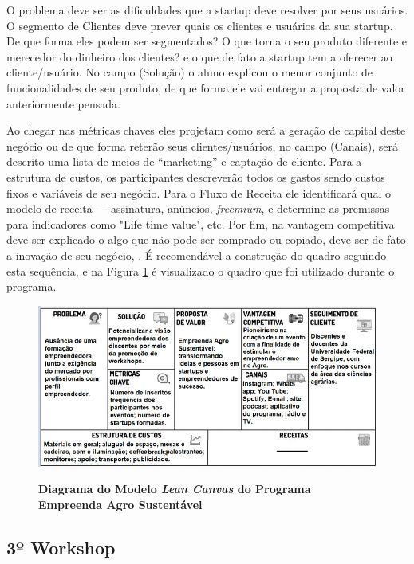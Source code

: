 O problema deve ser as dificuldades que a startup deve resolver por seus usuários. O segmento de Clientes deve prever quais os clientes e usuários da sua startup. De que forma eles podem ser segmentados? O que torna o seu produto diferente e merecedor do dinheiro dos clientes? e o que de fato a startup tem a oferecer ao cliente/usuário. No campo (Solução) o aluno explicou o menor conjunto de funcionalidades de seu produto, de que forma ele vai entregar a proposta de valor anteriormente pensada.

Ao chegar nas métricas chaves eles projetam como será a geração de capital deste negócio ou de que forma reterão seus clientes/usuários, no campo (Canais), será descrito uma lista de meios de “marketing” e captação de cliente. Para a estrutura de custos, os participantes descreverão todos os gastos sendo custos fixos e variáveis de seu negócio. Para o Fluxo de Receita ele identificará qual o modelo de receita — assinatura, anúncios, \textit{freemium}, e determine as premissas para indicadores como "Life time value", etc. Por fim, na vantagem competitiva deve ser explicado o algo que não pode ser comprado ou copiado, deve ser de fato a inovação de seu negócio,  \cite{maurya_running_2012, sebrae_aprenda_2019}. É recomendável a construção do quadro seguindo esta sequência, e na Figura \ref{figura_7} é visualizado o quadro que foi utilizado durante o programa.



\begin{figure}[h!]
\centering
\caption{\textbf{Diagrama do Modelo  \textit{Lean Canvas} do Programa Empreenda Agro Sustentável}}
\includegraphics[scale=0.9]{Imagens/canvas.png}
\label{figura_7}
\end{figure}
\newpage

\subsection{3º Workshop}
 
